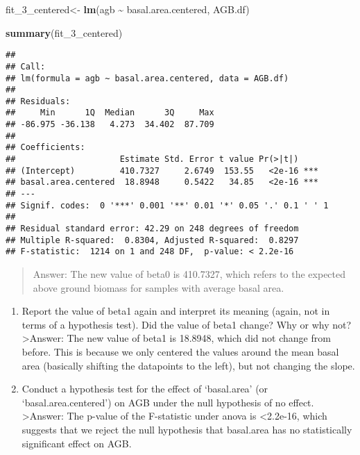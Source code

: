 \documentclass[
]{article}
\newenvironment{Shaded}{\begin{snugshade}}{\end{snugshade}}
\newcommand{\FunctionTok}[1]{\textcolor[rgb]{0.13,0.29,0.53}{\textbf{#1}}}
\newcommand{\NormalTok}[1]{#1}
\newcommand{\OtherTok}[1]{\textcolor[rgb]{0.56,0.35,0.01}{#1}}
\newcommand{\SpecialCharTok}[1]{\textcolor[rgb]{0.81,0.36,0.00}{\textbf{#1}}}
\begin{document}
\begin{Shaded}
\begin{Highlighting}[]
\NormalTok{fit\_3\_centered}\OtherTok{\textless{}{-}} \FunctionTok{lm}\NormalTok{(agb }\SpecialCharTok{\textasciitilde{}}\NormalTok{ basal.area.centered, AGB.df)}

\FunctionTok{summary}\NormalTok{(fit\_3\_centered)}
\end{Highlighting}
\end{Shaded}

\begin{verbatim}
## 
## Call:
## lm(formula = agb ~ basal.area.centered, data = AGB.df)
## 
## Residuals:
##     Min      1Q  Median      3Q     Max 
## -86.975 -36.138   4.273  34.402  87.709 
## 
## Coefficients:
##                     Estimate Std. Error t value Pr(>|t|)    
## (Intercept)         410.7327     2.6749  153.55   <2e-16 ***
## basal.area.centered  18.8948     0.5422   34.85   <2e-16 ***
## ---
## Signif. codes:  0 '***' 0.001 '**' 0.01 '*' 0.05 '.' 0.1 ' ' 1
## 
## Residual standard error: 42.29 on 248 degrees of freedom
## Multiple R-squared:  0.8304, Adjusted R-squared:  0.8297 
## F-statistic:  1214 on 1 and 248 DF,  p-value: < 2.2e-16
\end{verbatim}

\begin{quote}
Answer: The new value of beta0 is 410.7327, which refers to the expected
above ground biomass for samples with average basal area.
\end{quote}

\begin{enumerate}
\def\labelenumi{\alph{enumi}.}
\setcounter{enumi}{3}
\item
  Report the value of beta1 again and interpret its meaning (again, not
  in terms of a hypothesis test). Did the value of beta1 change? Why or
  why not? \textgreater Answer: The new value of beta1 is 18.8948, which
  did not change from before. This is because we only centered the
  values around the mean basal area (basically shifting the datapoints
  to the left), but not changing the slope.
\item
  Conduct a hypothesis test for the effect of `basal.area' (or
  `basal.area.centered') on AGB under the null hypothesis of no effect.
  \textgreater Answer: The p-value of the F-statistic under anova is
  \textless2.2e-16, which suggests that we reject the null hypothesis
  that basal.area has no statistically significant effect on AGB.
\end{enumerate}
\end{document}
